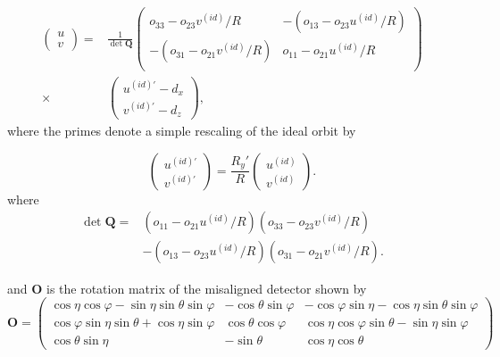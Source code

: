 \begin{equation}\label{eq:nonidealUVpoints}
\begin{split}
\begin{pmatrix}
u \\ v 
\end{pmatrix} = & \frac{1}{\det \mathbf{Q}} 
\begin{pmatrix}
o_{33}-o_{23}v^{(id)}/R & -(o_{13} - o_{23} u^{(id)}/R) \\
-(o_{31} - o_{21} v^{(id)}/R) & o_{11}-o_{21} u^{(id)}/R \\
\end{pmatrix} \\
\times & 
\begin{pmatrix}
u^{(id)'} - d_x \\
v^{(id)'} - d_z 
\end{pmatrix},
\end{split}
\end{equation}
where the primes denote a simple rescaling of the ideal orbit by

\begin{equation}
\begin{pmatrix}
u^{(id)'} \\ v^{(id)'}
\end{pmatrix}
= \frac{R_y'}{R}
\begin{pmatrix}
u^{(id)} \\ v^{(id)}
\end{pmatrix}.
\end{equation}
where
\begin{equation}
\begin{split}
\det \mathbf{Q} =& (o_{11} - o_{21} u^{(id)}/R)(o_{33}-o_{23}v^{(id)}/R) \\
& -(o_{13}-o_{23}u^{(id)}/R)(o_{31}-o_{21} v^{(id)}/R).
\end{split}
\end{equation}

and $\mathbf{O}$ is the rotation matrix of the misaligned detector shown by 
\begin{equation}
\mathbf{O} = 
\begin{pmatrix}
\cos \eta \cos \varphi - \sin \eta \sin \theta \sin \varphi & -\cos \theta \sin \varphi & -\cos \varphi \sin \eta - \cos \eta \sin \theta \sin \varphi \\
\cos \varphi \sin \eta \sin \theta + \cos \eta \sin \varphi & \cos \theta \cos \varphi & \cos \eta \cos \varphi \sin \theta - \sin \eta \sin \varphi \\
\cos \theta \sin \eta & -\sin \theta & \cos \eta \cos \theta
\end{pmatrix}
\end{equation}
